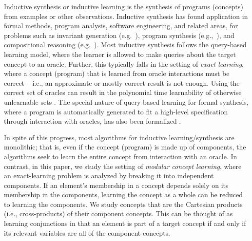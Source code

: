 
Inductive synthesis or inductive learning 
is the synthesis of programs (concepts) from examples or other observations. 
Inductive synthesis has found application in formal methods, program analysis,
software engineering, and related areas, for problems such as 
invariant generation (e.g.~\cite{garg2014ice}),
program synthesis (e.g.,~\cite{solar2006combinatorial}),
and compositional reasoning (e.g.~\cite{cobleigh2003learning}).
Most inductive synthesis follows the query-based learning model, where the
learner is allowed to make queries about the target concept to an oracle. 
Further, this typically falls in the setting of {\em exact learning}, where a concept (program)
that is learned from oracle interactions must be correct -- i.e., an approximate or mostly-correct result is not enough.
Using the correct set of oracles can result in the polynomial time learnability of otherwise unlearnable sets \cite{angluin1988queries}. 
The special nature of query-based learning for formal synthesis, where a program is automatically generated to fit a high-level specification through interaction with oracles,
has also been formalized \cite{jha2017theory}. 

In spite of this progress,
most algorithms for inductive learning/synthesis are monolithic; that is, even
if the concept (program) is made up of components, the algorithms seek to
learn the entire concept from interaction with an oracle.
In contrast, in this paper, we study the setting of {\em modular concept learning},
where an exact-learning problem is analyzed by breaking it into independent components. 
If an element's membership in a concept depends solely on its membership in the components, learning the concept as a whole can be reduced to learning the components. 
We study concepts that are the Cartesian products (i.e., cross-products) of their component concepts.  
This can be thought of as learning conjunctions in that an element is part of a target concept if and only if its relevant variables are all of the component concepts. 


